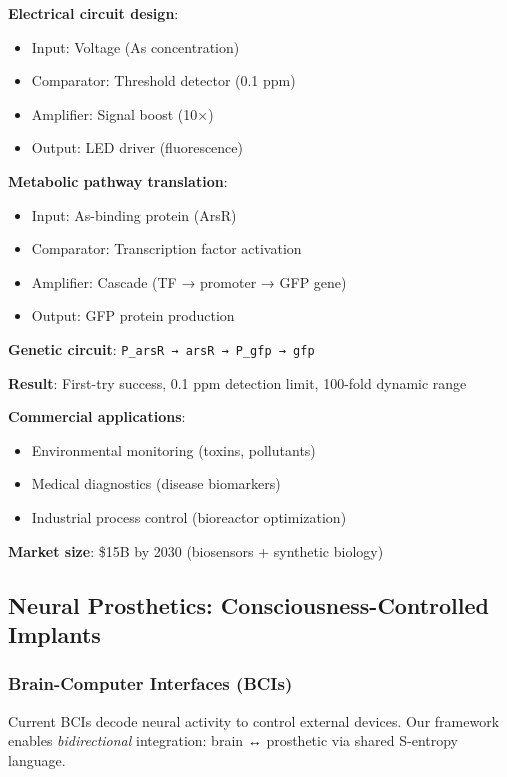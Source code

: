\documentclass[11pt,a4paper]{article}
\begin{document}
\textbf{Electrical circuit design}:
\begin{itemize}
\item Input: Voltage (As concentration)
\item Comparator: Threshold detector (0.1 ppm)
\item Amplifier: Signal boost (10$\times$)
\item Output: LED driver (fluorescence)
\end{itemize}

\textbf{Metabolic pathway translation}:
\begin{itemize}
\item Input: As-binding protein (ArsR)
\item Comparator: Transcription factor activation
\item Amplifier: Cascade (TF → promoter → GFP gene)
\item Output: GFP protein production
\end{itemize}

\textbf{Genetic circuit}: \texttt{P\_arsR → arsR → P\_gfp → gfp}

\textbf{Result}: First-try success, 0.1 ppm detection limit, 100-fold dynamic range

\textbf{Commercial applications}:
\begin{itemize}
\item Environmental monitoring (toxins, pollutants)
\item Medical diagnostics (disease biomarkers)
\item Industrial process control (bioreactor optimization)
\end{itemize}

\textbf{Market size}: \$15B by 2030 (biosensors + synthetic biology)

\subsection{Neural Prosthetics: Consciousness-Controlled Implants}

\subsubsection{Brain-Computer Interfaces (BCIs)}

Current BCIs decode neural activity to control external devices\cite{lebedev2017brain}. Our framework enables \textit{bidirectional} integration: brain ↔ prosthetic via shared S-entropy language.
\end{document}
